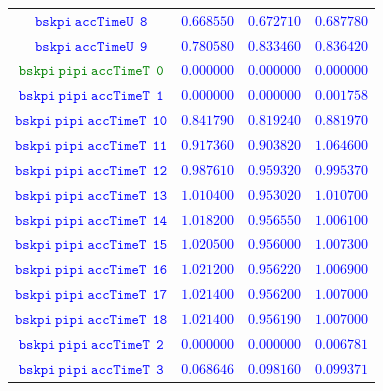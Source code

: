 \documentclass[10pt,a4paper]{article}
\begin{document}
\begin{table}[h!]
{\begin{tabular}{cccc}
\textcolor{blue}{$\mathtt{bskpi~accTimeU~~8}$} & \textcolor{blue}{$0.668550$}& \textcolor{blue}{$0.672710$}& \textcolor{blue}{$0.687780$}\\
\textcolor{blue}{$\mathtt{bskpi~accTimeU~~9}$} & \textcolor{blue}{$0.780580$}& \textcolor{blue}{$0.833460$}& \textcolor{blue}{$0.836420$}\\
\textcolor{Green}{$\mathtt{bskpi~pipi~accTimeT~~0}$} & \textcolor{blue}{$0.000000$}& \textcolor{blue}{$0.000000$}& \textcolor{blue}{$0.000000$}\\
\textcolor{blue}{$\mathtt{bskpi~pipi~accTimeT~~1}$} & \textcolor{blue}{$0.000000$}& \textcolor{blue}{$0.000000$}& \textcolor{blue}{$0.001758$}\\
\textcolor{blue}{$\mathtt{bskpi~pipi~accTimeT~~10}$} & \textcolor{blue}{$0.841790$}& \textcolor{blue}{$0.819240$}& \textcolor{blue}{$0.881970$}\\
\textcolor{blue}{$\mathtt{bskpi~pipi~accTimeT~~11}$} & \textcolor{blue}{$0.917360$}& \textcolor{blue}{$0.903820$}& \textcolor{blue}{$1.064600$}\\
\textcolor{blue}{$\mathtt{bskpi~pipi~accTimeT~~12}$} & \textcolor{blue}{$0.987610$}& \textcolor{blue}{$0.959320$}& \textcolor{blue}{$0.995370$}\\
\textcolor{blue}{$\mathtt{bskpi~pipi~accTimeT~~13}$} & \textcolor{blue}{$1.010400$}& \textcolor{blue}{$0.953020$}& \textcolor{blue}{$1.010700$}\\
\textcolor{blue}{$\mathtt{bskpi~pipi~accTimeT~~14}$} & \textcolor{blue}{$1.018200$}& \textcolor{blue}{$0.956550$}& \textcolor{blue}{$1.006100$}\\
\textcolor{blue}{$\mathtt{bskpi~pipi~accTimeT~~15}$} & \textcolor{blue}{$1.020500$}& \textcolor{blue}{$0.956000$}& \textcolor{blue}{$1.007300$}\\
\textcolor{blue}{$\mathtt{bskpi~pipi~accTimeT~~16}$} & \textcolor{blue}{$1.021200$}& \textcolor{blue}{$0.956220$}& \textcolor{blue}{$1.006900$}\\
\textcolor{blue}{$\mathtt{bskpi~pipi~accTimeT~~17}$} & \textcolor{blue}{$1.021400$}& \textcolor{blue}{$0.956200$}& \textcolor{blue}{$1.007000$}\\
\textcolor{blue}{$\mathtt{bskpi~pipi~accTimeT~~18}$} & \textcolor{blue}{$1.021400$}& \textcolor{blue}{$0.956190$}& \textcolor{blue}{$1.007000$}\\
\textcolor{blue}{$\mathtt{bskpi~pipi~accTimeT~~2}$} & \textcolor{blue}{$0.000000$}& \textcolor{blue}{$0.000000$}& \textcolor{blue}{$0.006781$}\\
\textcolor{blue}{$\mathtt{bskpi~pipi~accTimeT~~3}$} & \textcolor{blue}{$0.068646$}& \textcolor{blue}{$0.098160$}& \textcolor{blue}{$0.099371$}\\

\end{tabular}}
\end{table}
\end{document}
